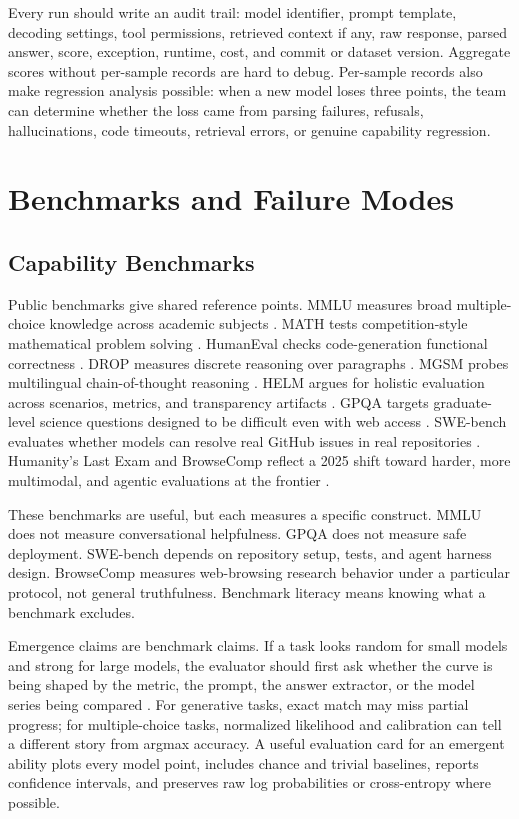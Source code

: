 Every run should write an audit trail: model identifier, prompt template, decoding settings, tool permissions, retrieved context if any, raw response, parsed answer, score, exception, runtime, cost, and commit or dataset version. Aggregate scores without per-sample records are hard to debug. Per-sample records also make regression analysis possible: when a new model loses three points, the team can determine whether the loss came from parsing failures, refusals, hallucinations, code timeouts, retrieval errors, or genuine capability regression.

\section{Benchmarks and Failure Modes}
\subsection{Capability Benchmarks}
Public benchmarks give shared reference points. MMLU measures broad multiple-choice knowledge across academic subjects \cite{hendrycks2020measuring}. MATH tests competition-style mathematical problem solving \cite{hendrycks2021math}. HumanEval checks code-generation functional correctness \cite{chen2021codex}. DROP measures discrete reasoning over paragraphs \cite{dua2019drop}. MGSM probes multilingual chain-of-thought reasoning \cite{shi2022mgsm}. HELM argues for holistic evaluation across scenarios, metrics, and transparency artifacts \cite{liang2022holistic}. GPQA targets graduate-level science questions designed to be difficult even with web access \cite{rein2023gpqa}. SWE-bench evaluates whether models can resolve real GitHub issues in real repositories \cite{jimenez2023swebench}. Humanity's Last Exam and BrowseComp reflect a 2025 shift toward harder, more multimodal, and agentic evaluations at the frontier \cite{phan2025humanity,openai2025browsecomp}.

These benchmarks are useful, but each measures a specific construct. MMLU does not measure conversational helpfulness. GPQA does not measure safe deployment. SWE-bench depends on repository setup, tests, and agent harness design. BrowseComp measures web-browsing research behavior under a particular protocol, not general truthfulness. Benchmark literacy means knowing what a benchmark excludes.

Emergence claims are benchmark claims. If a task looks random for small models and strong for large models, the evaluator should first ask whether the curve is being shaped by the metric, the prompt, the answer extractor, or the model series being compared \cite{wei2022emergent}. For generative tasks, exact match may miss partial progress; for multiple-choice tasks, normalized likelihood and calibration can tell a different story from argmax accuracy. A useful evaluation card for an emergent ability plots every model point, includes chance and trivial baselines, reports confidence intervals, and preserves raw log probabilities or cross-entropy where possible.

